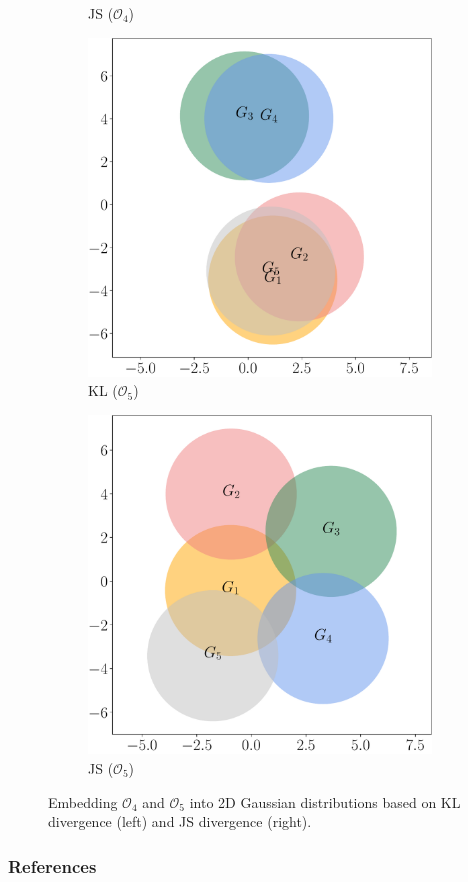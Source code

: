 \documentclass{article}
\begin{document}
\begin{figure}[t]
\begin{subfigure}[b]{.48\textwidth}
\caption{JS ($\mathcal{O}_4$)}
\end{subfigure}
%
\begin{subfigure}[b]{.48\textwidth}
\includegraphics[width=\textwidth]{kl5}
\caption{KL ($\mathcal{O}_5$)}
\end{subfigure}
\begin{subfigure}[b]{.48\textwidth}
\includegraphics[width=\textwidth]{js5}
\caption{JS ($\mathcal{O}_5$)}
\end{subfigure}
\caption{Embedding $\mathcal{O}_4$ and $\mathcal{O}_5$ into 2D Gaussian distributions based on
KL divergence (left) and JS divergence (right).}
\end{figure}
\renewcommand{\thefigure}{\arabic{figure}}



\subsubsection*{References}
\renewcommand{\refname}{}
\vspace{-2.5em}


\end{document}
